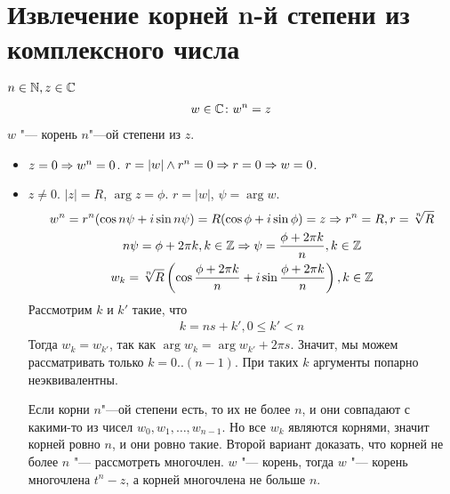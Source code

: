 \section{Извлечение корней n-й степени из комплексного числа}

\begin{Def}
$n \in \mathbb{N}, z \in \mathbb{C}$
\begin{gather*}
w \in \mathbb{C}\colon w^n = z
\end{gather*}
$w$ "--- корень $n$"---ой степени из $z$.
\end{Def}

\begin{itemize}
\item $z = 0 \Rightarrow w^n = 0$. $r = |w| \land r^n = 0 \Rightarrow r = 0 \Rightarrow w = 0$.
\item $z \ne 0$. $|z| = R$, $\arg z = \phi$. $r = |w|$, $\psi = \arg w$.
\begin{gather*}
w^n = r^n(\cos n\psi + i \sin n\psi) = R(\cos\phi + i \sin \phi) = z \Rightarrow r^n = R, r = \sqrt[n]{R} \\
n \psi = \phi + 2 \pi k, k \in \mathbb{Z} \Rightarrow \psi = \frac{\phi + 2 \pi k}{n}, k \in \mathbb{Z} \\
w_k = \sqrt[n]{R}\left(\cos{\frac{\phi + 2 \pi k}{n}} + i \sin{\frac{\phi + 2 \pi k}{n}}\right), k \in \mathbb{Z}
\end{gather*}
Рассмотрим $k$ и $k'$ такие, что 
\begin{gather*}
k = ns + k', 0 \leqslant k' < n
\end{gather*}
Тогда $w_k = w_{k'}$, так как $\arg w_k = \arg w_{k'} + 2 \pi s$. Значит, мы можем рассматривать только $k=0..(n - 1)$. При таких $k$ аргументы попарно неэквивалентны.

Если корни $n$"---ой степени есть, то их не более $n$, и они совпадают с какими-то из чисел $w_0, w_1, \ldots, w_{n - 1}$.  Но все $w_k$ являются корнями, значит корней ровно $n$, и они ровно такие. 
Второй вариант доказать, что корней не более $n$ "--- рассмотреть многочлен.
$w$ "--- корень, тогда $w$ "--- корень многочлена $t^n - z$, а корней многочлена не больше $n$. 
\end{itemize}